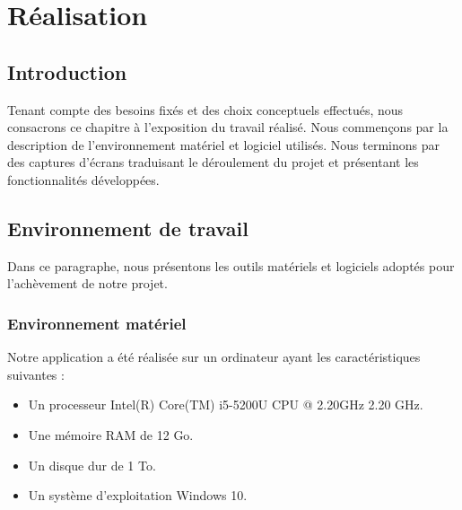 \chapter{Réalisation}
\section*{Introduction}
Tenant compte des besoins fixés et des choix conceptuels effectués, nous consacrons
ce chapitre à l’exposition du travail réalisé. Nous commençons par la description de
l’environnement matériel et logiciel utilisés. Nous terminons par des captures d’écrans traduisant le déroulement du projet et présentant les fonctionnalités développées.
\section{Environnement de travail}
Dans ce paragraphe, nous présentons les outils matériels et logiciels adoptés pour l’achèvement de notre projet.
\subsection{Environnement matériel}
Notre application a été réalisée sur un ordinateur ayant les caractéristiques suivantes : 
\begin{itemize}
    \item Un processeur Intel(R) Core(TM) i5-5200U CPU @ 2.20GHz 2.20 GHz.
    \item Une mémoire RAM de 12 Go.
    \item Un disque dur de 1 To.
    \item Un système d'exploitation Windows 10.
\end{itemize}
